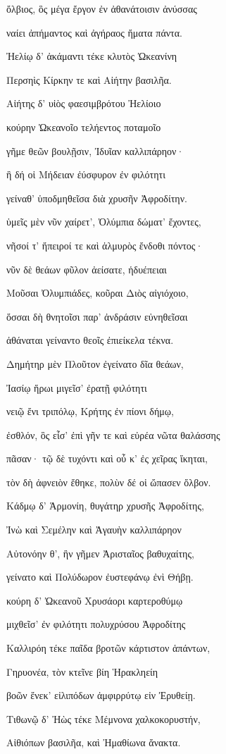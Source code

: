 \begin{pages}
\begin{Leftside}
ὄλβιος, ὃς μέγα ἔργον ἐν ἀθανάτοισιν ἀνύσσας

ναίει ἀπήμαντος καὶ ἀγήραος ἤματα πάντα. 

Ἠελίῳ δ' ἀκάμαντι τέκε κλυτὸς Ὠκεανίνη 

Περσηὶς Κίρκην τε καὶ Αἰήτην βασιλῆα.

Αἰήτης δ' υἱὸς φαεσιμβρότου Ἠελίοιο

κούρην Ὠκεανοῖο τελήεντος ποταμοῖο

γῆμε θεῶν βουλῇσιν, Ἰδυῖαν καλλιπάρηον· 

ἣ δή οἱ Μήδειαν ἐύσφυρον ἐν φιλότητι

γείναθ' ὑποδμηθεῖσα διὰ χρυσῆν Ἀφροδίτην. 

ὑμεῖς μὲν νῦν χαίρετ', Ὀλύμπια δώματ' ἔχοντες, 

νῆσοί τ' ἤπειροί τε καὶ ἁλμυρὸς ἔνδοθι πόντος· 

νῦν δὲ θεάων φῦλον ἀείσατε, ἡδυέπειαι 

Μοῦσαι Ὀλυμπιάδες, κοῦραι Διὸς αἰγιόχοιο,

ὅσσαι δὴ θνητοῖσι παρ' ἀνδράσιν εὐνηθεῖσαι

ἀθάναται γείναντο θεοῖς ἐπιείκελα τέκνα.

Δημήτηρ μὲν Πλοῦτον ἐγείνατο δῖα θεάων,

Ἰασίῳ ἥρωι μιγεῖσ' ἐρατῇ φιλότητι  

νειῷ ἔνι τριπόλῳ, Κρήτης ἐν πίονι δήμῳ,

ἐσθλόν, ὃς εἶσ' ἐπὶ γῆν τε καὶ εὐρέα νῶτα θαλάσσης

πᾶσαν· τῷ δὲ τυχόντι καὶ οὗ κ' ἐς χεῖρας ἵκηται, 

τὸν δὴ ἀφνειὸν ἔθηκε, πολὺν δέ οἱ ὤπασεν ὄλβον.

Κάδμῳ δ' Ἁρμονίη, θυγάτηρ χρυσῆς Ἀφροδίτης, 

Ἰνὼ καὶ Σεμέλην καὶ Ἀγαυὴν καλλιπάρηον 

Αὐτονόην θ', ἣν γῆμεν Ἀρισταῖος βαθυχαίτης,

γείνατο καὶ Πολύδωρον ἐυστεφάνῳ ἐνὶ Θήβῃ.

κούρη δ' Ὠκεανοῦ Χρυσάορι καρτεροθύμῳ

μιχθεῖσ' ἐν φιλότητι πολυχρύσου Ἀφροδίτης 

Καλλιρόη τέκε παῖδα βροτῶν κάρτιστον ἁπάντων,

Γηρυονέα, τὸν κτεῖνε βίη Ἡρακληείη

βοῶν ἕνεκ' εἰλιπόδων ἀμφιρρύτῳ εἰν Ἐρυθείῃ.

Τιθωνῷ δ' Ἠὼς τέκε Μέμνονα χαλκοκορυστήν,

Αἰθιόπων βασιλῆα, καὶ Ἠμαθίωνα ἄνακτα. 


\end{Leftside}
\end{pages}
